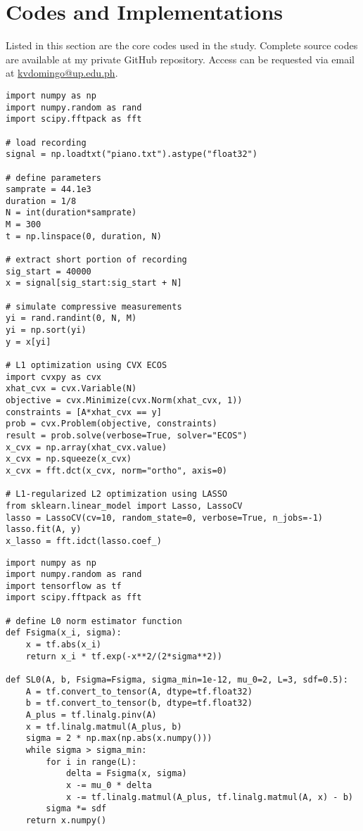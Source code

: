 \chapter{Codes and Implementations}
\label{appendix:codes}

Listed in this section are the core codes used in the study. Complete source codes are available at my private GitHub repository. Access can be requested via email at \url{kvdomingo@up.edu.ph}.

\singlespacing
{}


\begin{lstlisting}
import numpy as np
import numpy.random as rand
import scipy.fftpack as fft

# load recording
signal = np.loadtxt("piano.txt").astype("float32")

# define parameters
samprate = 44.1e3
duration = 1/8
N = int(duration*samprate)
M = 300
t = np.linspace(0, duration, N)

# extract short portion of recording
sig_start = 40000
x = signal[sig_start:sig_start + N]

# simulate compressive measurements
yi = rand.randint(0, N, M)
yi = np.sort(yi)
y = x[yi]

# L1 optimization using CVX ECOS
import cvxpy as cvx
xhat_cvx = cvx.Variable(N)
objective = cvx.Minimize(cvx.Norm(xhat_cvx, 1))
constraints = [A*xhat_cvx == y]
prob = cvx.Problem(objective, constraints)
result = prob.solve(verbose=True, solver="ECOS")
x_cvx = np.array(xhat_cvx.value)
x_cvx = np.squeeze(x_cvx)
x_cvx = fft.dct(x_cvx, norm="ortho", axis=0)

# L1-regularized L2 optimization using LASSO
from sklearn.linear_model import Lasso, LassoCV
lasso = LassoCV(cv=10, random_state=0, verbose=True, n_jobs=-1)
lasso.fit(A, y)
x_lasso = fft.idct(lasso.coef_)
\end{lstlisting}


\begin{lstlisting}
import numpy as np
import numpy.random as rand
import tensorflow as tf
import scipy.fftpack as fft

# define L0 norm estimator function
def Fsigma(x_i, sigma):
	x = tf.abs(x_i)
	return x_i * tf.exp(-x**2/(2*sigma**2))

def SL0(A, b, Fsigma=Fsigma, sigma_min=1e-12, mu_0=2, L=3, sdf=0.5):
	A = tf.convert_to_tensor(A, dtype=tf.float32)
	b = tf.convert_to_tensor(b, dtype=tf.float32)
	A_plus = tf.linalg.pinv(A)
	x = tf.linalg.matmul(A_plus, b)
	sigma = 2 * np.max(np.abs(x.numpy()))
	while sigma > sigma_min:
		for i in range(L):
			delta = Fsigma(x, sigma)
			x -= mu_0 * delta
			x -= tf.linalg.matmul(A_plus, tf.linalg.matmul(A, x) - b)
		sigma *= sdf
	return x.numpy()
\end{lstlisting}

